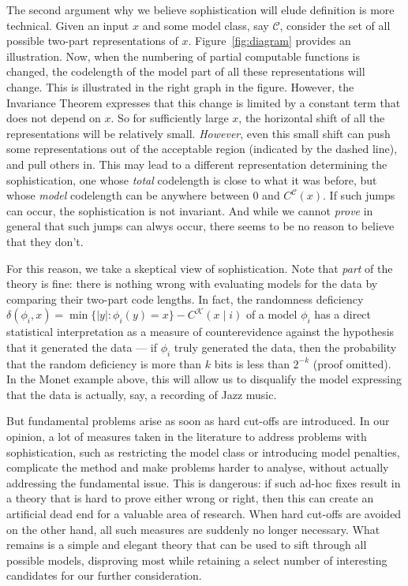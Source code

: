 \documentclass{style/llncs}
\newcommand{\C}{\mathscr C}
\newcommand{\K}{\mathscr K}
\begin{document}
The second argument why we believe sophistication will elude definition is more technical. Given an input $x$ and some model class, say $\C$, consider the set of all possible two-part representations of $x$. Figure~\ref{fig:diagram} provides an illustration. Now, when the numbering of partial computable functions is changed, the codelength of the model part of all these representations will change. This is illustrated in the right graph in the figure. However, the Invariance Theorem expresses that this change is limited by a constant term that does not depend on $x$. So for sufficiently large $x$, the horizontal shift of all the representations will be relatively small. \emph{However}, even this small shift can push some representations out of the acceptable region (indicated by the dashed line), and pull others in. This may lead to a different representation determining the sophistication, one whose \emph{total} codelength is close to what it was before, but whose \emph{model} codelength can be anywhere between $0$ and $C^\C(x)$. If such jumps can occur, the sophistication is not invariant. And while we cannot \emph{prove} in general that such jumps can alwys occur, there seems to be no reason to believe that they don't.

For this reason, we take a skeptical view of sophistication. Note that \emph{part} of the theory is fine: there is nothing wrong with evaluating models for the data by comparing their two-part code lengths. In fact, the randomness deficiency $\delta(\phi_i,x)=\min\{|y|:\phi_i(y)=x\}-C^\K(x\mid i)$ of a model $\phi_i$ has a direct statistical interpretation as a measure of counterevidence against the hypothesis that it generated the data --- if $\phi_i$ truly generated the data, then the probability that the random deficiency is more than $k$ bits is less than $2^{-k}$ (proof omitted). In the Monet example above, this will allow us to disqualify the model expressing that the data is actually, say, a recording of Jazz music.

But fundamental problems arise as soon as hard cut-offs are introduced. In our opinion, a lot of measures taken in the literature to address problems with sophistication, such as restricting the model class or introducing model penalties, complicate the method and make problems harder to analyse, without actually addressing the fundamental issue. This is dangerous: if such ad-hoc fixes result in a theory that is hard to prove either wrong or right, then this can create an artificial dead end for a valuable area of research. When hard cut-offs are avoided on the other hand, all such measures are suddenly no longer necessary. What remains is a simple and elegant theory that can be used to sift through all possible models, disproving most while retaining a select number of interesting candidates for our further consideration.
\end{document}
